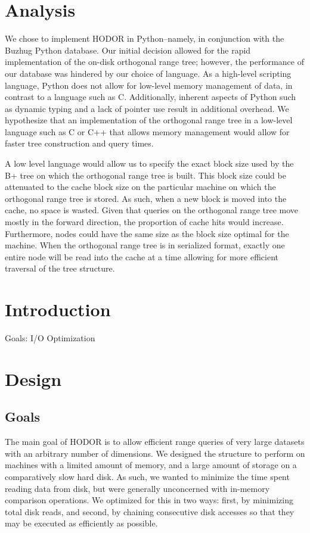 \documentclass[11pt, oneside]{article}
\begin{document}
\section{Analysis}

We chose to implement HODOR in Python--namely, in conjunction with the Buzhug Python database. Our initial decision allowed for the rapid implementation of the on-disk orthogonal range tree; however, the performance of our database was hindered by our choice of language. As a high-level scripting language, Python does not allow for low-level memory management of data, in contrast to a language such as C. Additionally, inherent aspects of Python such as dynamic typing and a lack of pointer use result in additional overhead. We hypothesize that an implementation of the orthogonal range tree in a low-level language such as C or C++ that allows memory management would allow for faster tree construction and query times. 

A low level language would allow us to specify the exact block size used by the B+ tree on which the orthogonal range tree is built. This block size could be attenuated to the cache block size on the particular machine on which the orthogonal range tree is stored. As such, when a new block is moved into the cache, no space is wasted. Given that queries on the orthogonal range tree move mostly in the forward direction, the proportion of cache hits would increase. Furthermore, nodes could have the same size as the block size optimal for the machine. When the orthogonal range tree is in serialized format, exactly one entire node will be read into the cache at a time allowing for more efficient traversal of the tree structure.









\section{Introduction}
Goals:
	I/O Optimization

\section{Design}

\subsection{Goals}
The main goal of HODOR is to allow efficient range queries of very large
datasets with an arbitrary number of dimensions. We designed the structure to
perform on machines with a limited amount of memory, and a large amount of
storage on a comparatively slow hard disk. As such, we wanted to minimize the
time spent reading data from disk, but were generally unconcerned with
in-memory comparison operations. We optimized for this in two ways: first, by
minimizing total disk reads, and second, by chaining consecutive disk accesses
so that they may be executed as efficiently as possible. 
\end{document}
